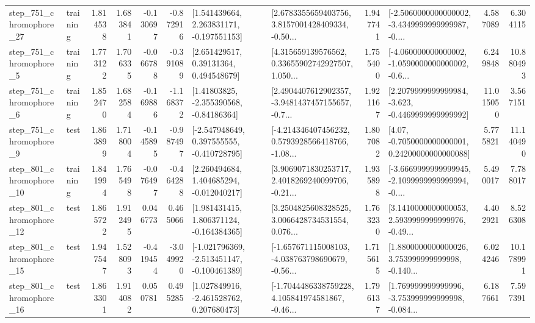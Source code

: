 \begin{tabular}{llrrrrllrlrr}
  step\_751\_chromophore\_27 &  training &      1.814538 &    1.683841 &     -0.130697 & -0.872916 &    [1.541439664, 2.263831171, -0.197551153] &  [2.6783355659403756, 3.8157001428409334, -0.50... &       1.947741 &  [-2.5060000000000002, -3.4349999999999987, -0.... &            4.587089 &          6.304115 \\
   step\_751\_chromophore\_5 &  training &      1.773122 &    1.706335 &     -0.066788 & -0.391089 &      [2.651429517, 0.39131364, 0.494548679] &  [4.315659139576562, 0.33655902742927507, 1.050... &       1.755400 &  [-4.060000000000002, -1.0590000000000002, -0.6... &            6.249848 &         10.880493 \\
   step\_751\_chromophore\_6 &  training &      1.852470 &    1.682584 &     -0.169886 & -1.168372 &     [1.41803825, -2.355390568, -0.84186364] &  [2.4904407612902357, -3.9481437457155657, -0.7... &       1.921167 &  [2.2079999999999984, -3.623, -0.4469999999999992] &           11.015050 &          3.567151 \\
   step\_751\_chromophore\_9 &      test &      1.863899 &    1.718004 &     -0.145895 & -0.987497 &   [-2.547948649, 0.397555555, -0.410728795] &  [-4.214346407456232, 0.5793928566418766, -1.08... &       1.807082 &   [4.07, -0.7050000000000001, 0.24200000000000088] &            5.775821 &         11.140490 \\
  step\_801\_chromophore\_10 &  training &      1.841994 &    1.765498 &     -0.076497 & -0.464288 &    [2.260494684, 1.404685294, -0.012040217] &  [3.9069071830253717, 2.4018269240099706, -0.21... &       1.935898 &  [-3.6669999999999945, -2.1099999999999994, -0.... &            5.490017 &          7.788017 \\
  step\_801\_chromophore\_12 &      test &      1.865722 &    1.912495 &      0.046773 &  0.465066 &    [1.981431415, 1.806371124, -0.164384365] &  [3.2504825608328525, 3.0066428734531554, 0.076... &       1.763230 &  [3.1410000000000053, 2.5939999999999976, -0.49... &            4.402921 &          8.526308 \\
  step\_801\_chromophore\_15 &      test &      1.947547 &    1.528093 &     -0.419454 & -3.049920 &  [-1.021796369, -2.513451147, -0.100461389] &  [-1.657671115008103, -4.038763798690679, -0.56... &       1.715615 &  [1.8800000000000026, 3.753999999999998, -0.140... &            6.024246 &         10.178991 \\
  step\_801\_chromophore\_16 &      test &      1.863301 &    1.914082 &      0.050781 &  0.495285 &    [1.027849916, -2.461528762, 0.207680473] &  [-1.7044486338759228, 4.105841974581867, -0.46... &       1.796137 &  [1.769999999999996, -3.753999999999998, -0.084... &            6.187661 &          7.597391 \\

\end{tabular}
